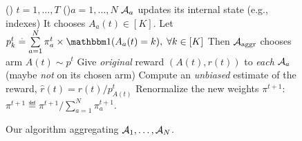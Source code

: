 	\begin{figure}[h!]
		\centering
		\begin{framed}
		\begin{algorithm}[H]
			\For()
            {$t = 1, \dots, T$}{
				\For(){$a = 1, \dots, N$}{
					$\Alg_a$ updates its internal state (e.g., \UCB{} indexes)\;
					It chooses $A_a(t) \in [K]$.
				}
				Let $p^{t}_k \eqdef \sum\limits_{a = 1}^{N} \pi^{t}_a \times \indic(A_a(t) = k), \;\forall k\in[K]$\;
				Then $\mathcal{A}_{\mathrm{aggr}}$ chooses arm $A(t) \sim p^{t}$\;
				Give \emph{original} reward $(A(t), r(t))$ to \emph{each} $\Alg_a$ (maybe \emph{not} on its chosen arm)\;
				Compute an \emph{unbiased} estimate of the reward, $\widehat{r}(t) = r(t) / p^{t}_{A(t)}$\;
				\For{$a = 1, \dots, N$}{
					\uIf{$\Alg_a$ was trusted, \ie, $A_a(t) = A(t)$}{
						$ \pi^{t+1}_{a} = \exp(\eta_t \widehat{r}(t)) \times \pi^{t}_{a} $
						\tcp*{Trusted more}
					}
					\uElse{
						$ \pi^{t+1}_{a} = \pi^{t}_{a} $
						\tcp*{Do not update the trust now}
					}
				}
				Renormalize the new weights $\pi^{t+1}$: $\pi^{t+1} \eqdef \pi^{t+1} / \sum_{a=1}^{N} \pi^{t+1}_{a}$.
			}
			\caption{Our algorithm \Aggr{} aggregating $\mathcal{A}_1,\dots,\mathcal{A}_N$.}
			\label{algo:25:Aggr}
		\end{algorithm}
		\end{framed}
	\end{figure}


